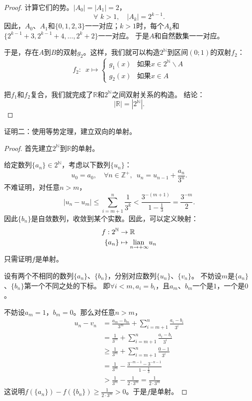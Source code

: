 \documentclass[12pt,UTF8]{ctexbook}
\begin{document}
\begin{appendix}
\begin{proof}
    计算它们的势。$|A_0| = |A_1| = 2$，
    $$ \forall \,\, k > 1, \quad |A_k| = 2^{k-1}. $$
    因此，$A_0$、$A_1$和$\{0,1,2,3\}$一一对应；$k>1$时，每个$A_k$和$\{2^{k-1}+3,2^{k-1}+4,\ldots, 2^k+2\}$一一对应。
    于是$A$和自然数集一一对应。

    于是，存在$A$到$B$的双射$g_2$。这样，我们就可以构造$2^\mathbb{N}$到区间$(0;1)$的双射$f_2$：
    $$ f_2:\,\,\,x\mapsto \left\{
        \begin{array}{cl}
            g_1(x) & \mbox{如果}x \in 2^\mathbb{N}\backslash A \\
            g_2(x) & \mbox{如果}x \in A 
        \end{array}\right.
    $$

    把$f_1$和$f_2$复合，我们就完成了$\mathbb{R}$和$2^\mathbb{N}$之间双射关系的构造。
    结论：
    $$ |\mathbb{R}| = |2^\mathbb{N}|. $$

\end{proof}

证明二：使用等势定理，建立双向的单射。

\begin{proof}
    首先建立$2^\mathbb{N}$到$\mathbb{R}$的单射。

    给定数列$\{a_n\}\in2^\mathbb{N}$，考虑以下数列$\{u_n\}$：
    $$ u_0 = a_0, \quad  \forall n\in \mathbb{Z}^+ , \,\,\, u_n = u_{n-1} + \frac{a_n}{3^n}. $$
    不难证明，对任意$n>m$，
    $$|u_n - u_m| \leqslant \sum_{i=m+1}^n \frac{1}{3^k} < \frac{3^{-(m+1)}}{1 - \frac{1}{3}} = \frac{3^{-m}}{2}.$$
    因此$\{b_n\}$是自敛数列，收敛到某个实数。因此，可以定义映射：
    \begin{align*}
        f : 2^\mathbb{N} &\rightarrow \mathbb{R}  \\
        \{a_n\} &\mapsto \underset{n\to +\infty}{\operatorname{lian}\,} u_n 
    \end{align*}
    只需证明$f$是单射。

    设有两个不相同的数列$\{a_n\}$、$\{b_n\}$，分别对应数列$\{u_n\}$、$\{v_n\}$。
    不妨设$m$是$\{a_n\}$、$\{b_n\}$第一个不同之处的下标。
    即$\forall i<m, a_i = b_i$，且$a_m$、$b_m$一个是$1$，一个是$0$。

    不妨设$a_m = 1$，$b_m = 0$。那么对任意$n>m$，
    \begin{align*}
        u_n - v_n &= \frac{a_m - b_m}{3^m} + \sum_{i=m+1}^n \frac{a_i - b_i}{3^i}  \\
        &= \frac{1}{3^m} + \sum_{i=m+1}^n \frac{a_i - b_i}{3^i}  \\
        &\geqslant \frac{1}{3^m} + \sum_{i=m+1}^n \frac{0 - 1}{3^i}  \\
        &= \frac{1}{3^m} - \frac{3^{-m-1} - 3^{-n-1}}{1 - \frac{1}{3}}  \\
        &> \frac{1}{3^m} - \frac{1}{2\cdot 3^m} = \frac{1}{2\cdot 3^m} 
    \end{align*}
    这说明$f(\{a_n\}) - f(\{b_n\}) \geqslant \frac{1}{2\cdot 3^m} > 0$。于是$f$是单射。


\end{proof}
\end{appendix}
\end{document}
